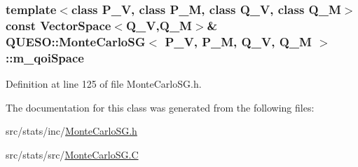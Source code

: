 \hypertarget{class_q_u_e_s_o_1_1_monte_carlo_s_g_a1df92e2ff2e7fa19d4ea158e71670ca3}{
\subsubsection[{m\-\_\-qoi\-Space}]{\setlength{\rightskip}{0pt plus 5cm}template$<$class P\-\_\-\-V, class P\-\_\-\-M, class Q\-\_\-\-V, class Q\-\_\-\-M$>$ const {\bf Vector\-Space}$<$Q\-\_\-\-V,Q\-\_\-\-M$>$\& {\bf Q\-U\-E\-S\-O\-::\-Monte\-Carlo\-S\-G}$<$ P\-\_\-\-V, P\-\_\-\-M, Q\-\_\-\-V, Q\-\_\-\-M $>$\-::m\-\_\-qoi\-Space\hspace{0.3cm}{\ttfamily [private]}}}\label{class_q_u_e_s_o_1_1_monte_carlo_s_g_a1df92e2ff2e7fa19d4ea158e71670ca3}


Definition at line 125 of file Monte\-Carlo\-S\-G.\-h.



The documentation for this class was generated from the following files\-:\begin{DoxyCompactItemize}
\item 
src/stats/inc/\hyperlink{_monte_carlo_s_g_8h}{Monte\-Carlo\-S\-G.\-h}\item 
src/stats/src/\hyperlink{_monte_carlo_s_g_8_c}{Monte\-Carlo\-S\-G.\-C}\end{DoxyCompactItemize}
